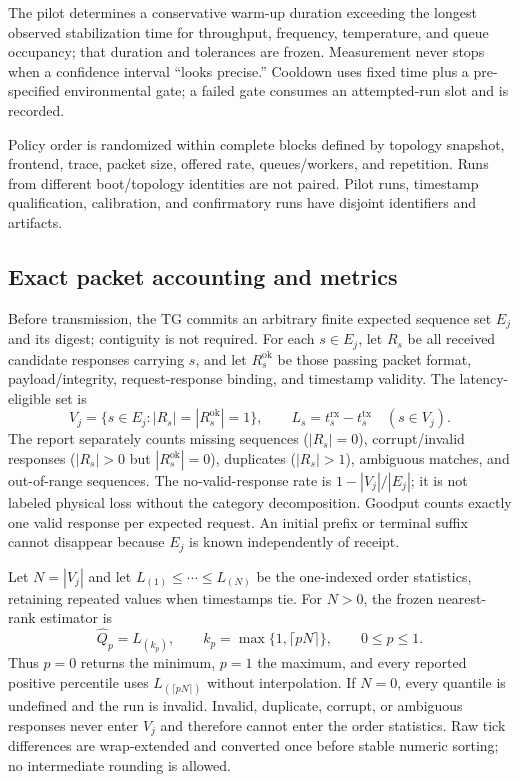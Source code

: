 The pilot determines a conservative warm-up duration exceeding the longest observed stabilization time for throughput, frequency, temperature, and queue occupancy; that duration and tolerances are frozen. Measurement never stops when a confidence interval “looks precise.” Cooldown uses fixed time plus a pre-specified environmental gate; a failed gate consumes an attempted-run slot and is recorded.

Policy order is randomized within complete blocks defined by topology snapshot, frontend, trace, packet size, offered rate, queues/workers, and repetition. Runs from different boot/topology identities are not paired. Pilot runs, timestamp qualification, calibration, and confirmatory runs have disjoint identifiers and artifacts.

\subsection{Exact packet accounting and metrics}

Before transmission, the TG commits an arbitrary finite expected sequence set $E_j$ and its digest; contiguity is not required. For each $s\in E_j$, let $R_s$ be all received candidate responses carrying $s$, and let $R_s^{\mathrm{ok}}$ be those passing packet format, payload/integrity, request-response binding, and timestamp validity. The latency-eligible set is
\begin{equation}
 V_j=\{s\in E_j:|R_s|=|R_s^{\mathrm{ok}}|=1\},\qquad
 L_s=t_s^{\mathrm{rx}}-t_s^{\mathrm{tx}}\quad(s\in V_j).
 \label{eq:valid-sequence-set}
\end{equation}
The report separately counts missing sequences ($|R_s|=0$), corrupt/invalid responses ($|R_s|>0$ but $|R_s^{\mathrm{ok}}|=0$), duplicates ($|R_s|>1$), ambiguous matches, and out-of-range sequences. The no-valid-response rate is $1-|V_j|/|E_j|$; it is not labeled physical loss without the category decomposition. Goodput counts exactly one valid response per expected request. An initial prefix or terminal suffix cannot disappear because $E_j$ is known independently of receipt.

Let $N=|V_j|$ and let $L_{(1)}\leq\cdots\leq L_{(N)}$ be the one-indexed order statistics, retaining repeated values when timestamps tie. For $N>0$, the frozen nearest-rank estimator is
\begin{equation}
 \widehat Q_p=L_{(k_p)},\qquad
 k_p=\max\{1,\lceil pN\rceil\},\qquad 0\leq p\leq1.
 \label{eq:nearest-rank}
\end{equation}
Thus $p=0$ returns the minimum, $p=1$ the maximum, and every reported positive percentile uses $L_{(\lceil pN\rceil)}$ without interpolation. If $N=0$, every quantile is undefined and the run is invalid. Invalid, duplicate, corrupt, or ambiguous responses never enter $V_j$ and therefore cannot enter the order statistics. Raw tick differences are wrap-extended and converted once before stable numeric sorting; no intermediate rounding is allowed.

